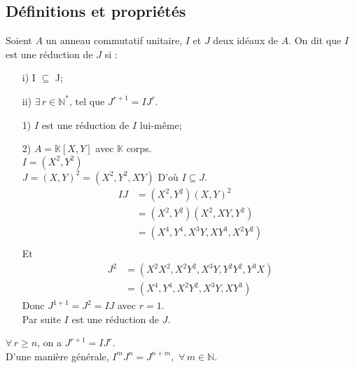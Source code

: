 \subsection{Définitions et propriétés}
\begin{madefinition}
	Soient $A$ un anneau commutatif unitaire, $I$ et $J$ deux id\'eaux de $A$.
	On dit que $I$ est une réduction de $J$ si :\\
	\begin{enumerate}
		\item[i)] I $\subseteq$ J;
		\item[ii)] $\exists \, r\in \mathbb{N}^{*} \text{, tel que } J^{r+1} = IJ^{r}$.
	\end{enumerate}
\end{madefinition}
\begin{monexemple}
	\begin{enumerate}
		\item[1)] $I$ est une réduction de $I$ lui-même;
		\item[2)] $A =\mathbb{K}[X,Y]$ avec $\mathbb{K}$ corps.\\
		$I = (X^2, Y^2)$\\
		$J = (X,Y)^2 = (X^2, Y^2, XY) $ D'où $I \subseteq J$.
		\begin{align*}
			IJ&= (X^{2},Y^{2})(X,Y)^{2}\\
			&= (X^{2},Y^{2})(X^{2},XY,Y^{2})\\
			&= (X^{4},Y^{4},X^{3}Y,XY^{3},X^{2}Y^{2})\\
		\end{align*}
		Et \\ 
		\begin{align*}
			J^2 &= (X^2X^2, X^2Y^2, X^3Y, Y^2Y^2, Y^3X)\\
			&= (X^4, Y^4, X^2Y^2, X^3Y, XY^3)
		\end{align*}
		Donc $J^{1+1} = J^2 = IJ $ avec $r=1$.\\
		Par suite $I$ est une réduction de $J$.
	\end{enumerate}
\end{monexemple}
\begin{maremarque}
	$\forall \, r\geq n$, on a $J^{r+1} = IJ^{r}$.\\
	D'une manière générale, $I^{m}J^{n}=J^{n+m}, \, \, \forall \, m\in \mathbb{N}$.	
\end{maremarque}

